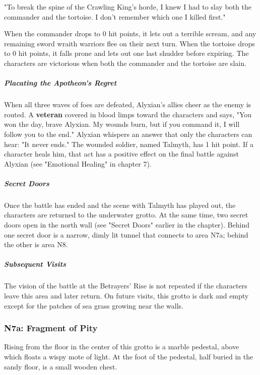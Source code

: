 \documentclass[10pt,a4paper,twoside,fancy,bg=print,twocolumn,openany,nodeprecatedcode]{dndbook}
\begin{document}
\begin{DndReadAloud}{}
"To break the spine of the Crawling King's horde, I knew I had to slay both the commander and the tortoise. I don't remember which one I killed first."

\end{DndReadAloud}

When the commander drops to 0 hit points, it lets out a terrible scream, and any remaining sword wraith warriors flee on their next turn. When the tortoise drops to 0 hit points, it falls prone and lets out one last shudder before expiring. The characters are victorious when both the commander and the tortoise are slain.

\subparagraph{Placating the Apotheon's Regret}
When all three waves of foes are defeated, Alyxian's allies cheer as the enemy is routed. A \textbf{veteran} covered in blood limps toward the characters and says, "You won the day, brave Alyxian. My wounds burn, but if you command it, I will follow you to the end." Alyxian whispers an answer that only the characters can hear: "It never ends." The wounded soldier, named Talmyth, has 1 hit point. If a character heals him, that act has a positive effect on the final battle against Alyxian (see "Emotional Healing" in chapter 7).

\subparagraph{Secret Doors}
Once the battle has ended and the scene with Talmyth has played out, the characters are returned to the underwater grotto. At the same time, two secret doors open in the north wall (see "Secret Doors" earlier in the chapter). Behind one secret door is a narrow, dimly lit tunnel that connects to area N7a; behind the other is area N8.

\subparagraph{Subsequent Visits}
The vision of the battle at the Betrayers' Rise is not repeated if the characters leave this area and later return. On future visits, this grotto is dark and empty except for the patches of sea grass growing near the walls.

\subsubsection{N7a: Fragment of Pity}
\begin{DndReadAloud}{}
Rising from the floor in the center of this grotto is a marble pedestal, above which floats a wispy mote of light. At the foot of the pedestal, half buried in the sandy floor, is a small wooden chest.

\end{DndReadAloud}
\end{document}
